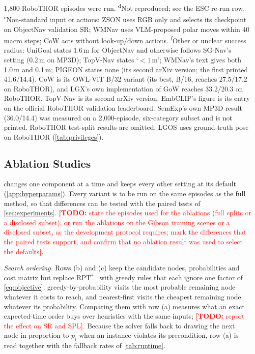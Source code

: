 \documentclass[10pt]{article}
\newcommand{\TODO}[1]{\textcolor{red}{\textbf{[TODO:} #1\textbf{]}}}
\newcommand{\ours}{LGOS\xspace}
\newcommand{\SR}{\textsc{SR}\xspace}
\newcommand{\SPL}{\textsc{SPL}\xspace}
\begin{document}
\begin{table}[tp]
{1{,}800 RoboTHOR episodes were run. \textsuperscript{d}Not reproduced; see the ESC re-run row.
\textsuperscript{e}Non-standard input or actions: ZSON uses RGB only and selects its checkpoint on ObjectNav validation
\SR; WMNav uses VLM-proposed polar moves within 40 macro steps; CoW acts without look-up/down actions.
\textsuperscript{f}Other or unclear success radius: UniGoal states 1.6\,m for ObjectNav and otherwise follows SG-Nav's
setting (0.2\,m on MP3D); TopV-Nav states `$<1$\,m'; WMNav's text gives both 1.0\,m and 0.1\,m; PIGEON states none (its second arXiv
version; the first printed 41.6/14.4). CoW is its OWL-ViT B/32 variant (its best, B/16, reaches 27.5/17.2 on RoboTHOR), and
LGX's own implementation of GoW reaches 33.2/20.3 on RoboTHOR. TopV-Nav is its second arXiv version. EmbCLIP's figure
is its entry on the official RoboTHOR validation leaderboard. SemExp's own MP3D result (36.0/14.4) was measured on a
2{,}000-episode, six-category subset and is not printed. RoboTHOR test-split results are omitted. \ours uses
ground-truth pose on RoboTHOR (\cref{tab:privileges}).}
\end{table}

\subsection{Ablation Studies}\label{sec:ablations}

 changes one component at a time and keeps every other setting at its default
(\cref{app:hyperparams}). Every variant is to be run on the same episodes as the full method, so that differences
can be tested with the paired tests of \cref{sec:experiments}. \TODO{state the episodes used for the ablations (full
splits or a disclosed subset), or run the ablations on the Gibson training scenes or a disclosed subset, as the
development protocol requires; mark the differences that the paired tests support, and confirm that no ablation result
was used to select the defaults}.

\emph{Search ordering.} Rows (b) and (c) keep the candidate nodes, probabilities and cost matrix but replace
RPT$^{*}$~\citep{lyu2026rpt} with greedy rules that each ignore one factor of \cref{eq:objective}:
greedy-by-probability visits the most probable remaining node whatever it costs to reach, and nearest-first visits
the cheapest remaining node whatever its probability. Comparing them with row (a) measures what an exact expected-time
order buys over heuristics with the same inputs; \TODO{report the effect on \SR and \SPL}. Because the solver falls
back to drawing the next node in proportion to $p_i$ when an instance violates its precondition, row (a) is read
together with the fallback rates of \cref{tab:runtime}.
\end{document}
